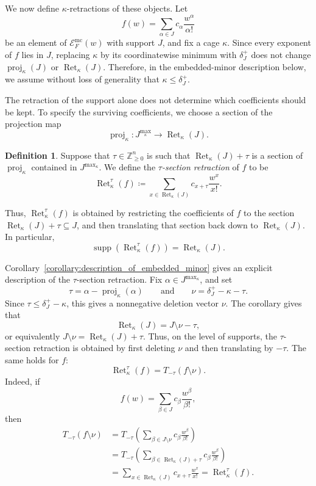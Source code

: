 \documentclass[11pt]{article}
\theoremstyle{definition}
\newtheorem{definition}[theorem]{Definition}
\theoremstyle{remark}
\newcommand{\Zgeqn}{\mathbb{Z}_{\geq 0}^n}     %
\newcommand{\delplus}{\delta_J^+}
\DeclareMathOperator{\supp}{supp}
\DeclareMathOperator{\proj}{proj}              %
\newcommand{\kproj}{\proj_{\kappa}}            %
\DeclareMathOperator{\Ret}{Ret}                %
\newcommand{\RetK}{\Ret_{\kappa}}              %
\newcommand{\Jmax}{J^{\max_{\kappa}}}
\begin{document}
We now define $\kappa$-retractions of these objects. Let
\[
    f(w)=\sum_{\alpha\in J} c_\alpha \frac{w^\alpha}{\alpha!}
\]
be an element of $\mathcal{E}^{\mathrm{mc}}_F(w)$ with support $J$, and fix a cage $\kappa$. Since every exponent of $f$ lies in $J$, replacing $\kappa$ by its coordinatewise minimum with $\delplus$ does not change $\kproj(J)$ or $\RetK(J)$. Therefore, in the embedded-minor description below, we assume without loss of generality that $\kappa\leq\delplus$. 

The retraction of the support alone does not determine which coefficients should be kept. To specify the surviving coefficients, we choose a section of the projection map
\[
    \kproj\colon \Jmax \to \RetK(J).
\]

\begin{definition}\label{def:Ret_polynomial}
    Suppose that $\tau\in\Zgeqn$ is such that $\RetK(J)+\tau$ is a section of $\kproj$ contained in $\Jmax$. We define the \emph{$\tau$-section retraction} of $f$ to be
    \[
        \RetK^\tau(f)
        \coloneqq
        \sum_{x\in \RetK(J)}
        c_{x+\tau}
        \frac{w^x}{x!}.
    \]
\end{definition}

Thus, $\RetK^\tau(f)$ is obtained by restricting the coefficients of $f$ to the section $\RetK(J)+\tau\subseteq J$, and then translating that section back down to $\RetK(J)$. In particular,
\[
    \supp(\RetK^\tau(f))=\RetK(J).
\]

Corollary~\ref{corollary:description_of_embedded_minor} gives an explicit description of the $\tau$-section retraction. Fix $\alpha\in\Jmax$, and set
\[
    \tau=\alpha-\kproj(\alpha)
    \qquad\text{and}\qquad
    \nu=\delplus-\kappa-\tau.
\]
Since $\tau \leq \delplus - \kappa$, this gives a nonnegative deletion vector $\nu$. The corollary gives that
\[
    \RetK(J)=J\setminus\nu-\tau,
\]
or equivalently $J\setminus\nu=\RetK(J)+\tau$. Thus, on the level of supports, the $\tau$-section retraction is obtained by first deleting $\nu$ and then translating by $-\tau$. The same holds for $f$:
\[
    \RetK^\tau(f)=T_{-\tau}(f\setminus\nu).
\]
Indeed, if
\[
    f(w)=\sum_{\beta\in J} c_\beta \frac{w^\beta}{\beta!},
\]
then
\begin{align*}
    T_{-\tau}(f\setminus\nu)
    &=
    T_{-\tau}
    \left(
        \sum_{\beta\in J\setminus\nu}
        c_\beta \frac{w^\beta}{\beta!}
    \right) \\
    &=
    T_{-\tau}
    \left(
        \sum_{\beta\in \RetK(J)+\tau}
        c_\beta \frac{w^\beta}{\beta!}
    \right) \\
    &=
    \sum_{x\in\RetK(J)}
    c_{x+\tau}\frac{w^x}{x!}
    =
    \RetK^\tau(f).
\end{align*}
\end{document}
